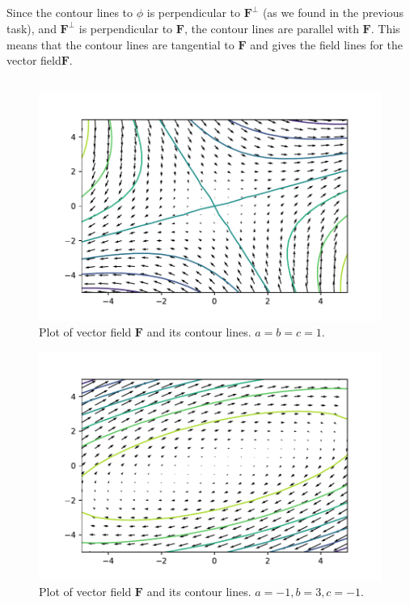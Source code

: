 \documentclass[a4paper,10pt,english]{article}
\begin{document}
\newpage
\subsection{}
Since the contour lines to $\phi$ is perpendicular to $\bm{F^\perp}$ (as we found in the previous task), and $\bm{F^\perp}$ is perpendicular to $\bm{F}$, the contour lines are parallel with $\bm{F}$. This means that the contour lines are tangential to $\bm{F}$ and gives the field lines for the vector field$\bm{F}$.

\subsection{}
\vspace{-1cm}
\begin{figure}[h]
    \centering
    \includegraphics[scale=0.8]{figure2.pdf}
    \caption{Plot of vector field $\bm{F}$ and its contour lines. $a=b=c=1$.}
    \label{fig:fig2}
\end{figure}
\vspace{-1cm}
\begin{figure}[h!]
    \centering
    \includegraphics[scale=0.8]{figure3.pdf}
    \caption{Plot of vector field $\bm{F}$ and its contour lines. $a=-1, b=3, c=-1$.}
    \label{fig:fig3}
\end{figure}
\end{document}
